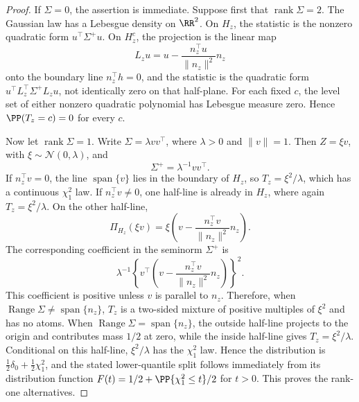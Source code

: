 \begin{proof}
If \(\Sigma=0\), the assertion is immediate.  Suppose first that
\(\operatorname{rank}\Sigma=2\).  The Gaussian law has a Lebesgue density on
\(\RR^2\).  On \(H_z\), the statistic is the nonzero quadratic form
\(u^\top\Sigma^+u\).  On \(H_z^c\), the projection is the linear map
\[
L_z u=u-\frac{n_z^\top u}{\|n_z\|^2}n_z
\]
onto the boundary line \(n_z^\top h=0\), and the statistic is the quadratic
form \(u^\top L_z^\top\Sigma^+L_z u\), not identically zero on that half-plane.
For each fixed \(c\), the level set of either nonzero quadratic polynomial has
Lebesgue measure zero.  Hence \(\PP(T_z=c)=0\) for every \(c\).

Now let \(\operatorname{rank}\Sigma=1\).  Write
\(\Sigma=\lambda vv^\top\), where \(\lambda>0\) and \(\|v\|=1\).  Then
\(Z=\xi v\), with \(\xi\sim\mathcal N(0,\lambda)\), and
\[
\Sigma^+=\lambda^{-1}vv^\top .
\]
If \(n_z^\top v=0\), the line
\(\operatorname{span}\{v\}\) lies in the boundary of \(H_z\), so
\(T_z=\xi^2/\lambda\), which has a continuous \(\chi^2_1\) law.  If
\(n_z^\top v\ne0\), one half-line is already in \(H_z\), where again
\(T_z=\xi^2/\lambda\).  On the other half-line,
\[
\Pi_{H_z}(\xi v)=
\xi\left(v-\frac{n_z^\top v}{\|n_z\|^2}n_z\right).
\]
The corresponding coefficient in the seminorm \(\Sigma^+\) is
\[
\lambda^{-1}
\left\{v^\top\left(v-\frac{n_z^\top v}{\|n_z\|^2}n_z\right)\right\}^2 .
\]
This coefficient is positive unless \(v\) is parallel to \(n_z\).  Therefore,
when \(\operatorname{Range}\Sigma\ne\operatorname{span}\{n_z\}\), \(T_z\) is
a two-sided mixture of positive multiples of \(\xi^2\) and has no atoms.  When
  \(\operatorname{Range}\Sigma=\operatorname{span}\{n_z\}\), the outside
  half-line projects to the origin and contributes mass \(1/2\) at zero, while
  the inside half-line gives \(T_z=\xi^2/\lambda\).  Conditional on this
  half-line, \(\xi^2/\lambda\) has the \(\chi^2_1\) law.  Hence the distribution
  is \(\frac12\delta_0+\frac12\chi^2_1\), and the stated lower-quantile split
  follows immediately from its distribution function
  \(F(t)=1/2+\PP\{\chi^2_1\le t\}/2\) for \(t>0\).  This proves the rank-one
  alternatives.
\end{proof}

